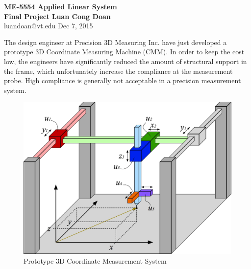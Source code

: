 \documentclass[14pt,a4paper]{article}
\begin{document}
\label{cover}
\begin{center}
	\vspace*{3cm}
	\large{\textbf{ME-5554 Applied Linear System \\ Final Project}}
	\vfill
	\textbf{Luan Cong Doan} \\ luandoan@vt.edu
	\vfill
	Dec 7, 2015
\end{center}
\pagebreak

The design engineer at Precision 3D Measuring Inc. have just developed a prototype 3D Coordinate Measuring Machine (CMM). In order to keep the cost low, the engineers have significantly reduced the amount of structural support in the frame, which unfortunately increase the compliance at the measurement probe. High compliance is generally not acceptable in a precision measurement system.\\

\begin{figure} [htp]
	\centering
	\includegraphics[scale=0.4]{MidtermProject.jpg}
	\caption{Prototype 3D Coordinate Measurement System}
\end{figure}
\end{document}
